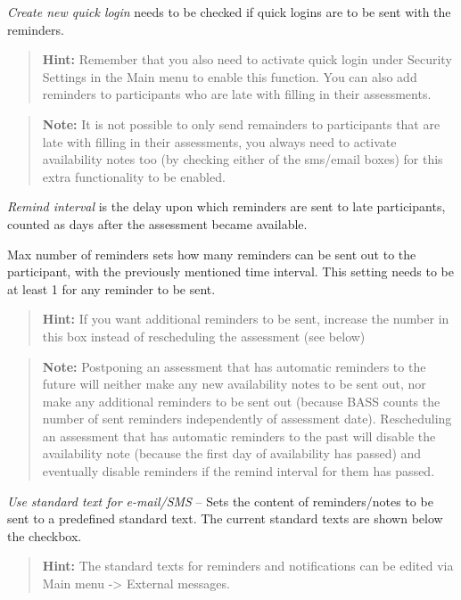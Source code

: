 \documentclass[]{book}
\begin{document}
\emph{Create new quick login} needs to be checked if quick logins are to be sent with the reminders.

\begin{quote}
\textbf{Hint:} Remember that you also need to activate quick login under Security Settings in the Main menu to enable this function.
You can also add reminders to participants who are late with filling in their assessments.
\end{quote}

\begin{quote}
\textbf{Note:} It is not possible to only send remainders to participants that are late with filling in their assessments, you always need to activate availability notes too (by checking either of the sms/email boxes) for this extra functionality to be enabled.
\end{quote}

\emph{Remind interval} is the delay upon which reminders are sent to late participants, counted as days after the assessment became available.

Max number of reminders sets how many reminders can be sent out to the participant, with the previously mentioned time interval. This setting needs to be at least 1 for any reminder to be sent.

\begin{quote}
\textbf{Hint:} If you want additional reminders to be sent, increase the number in this box instead of rescheduling the assessment (see below)
\end{quote}

\begin{quote}
\textbf{Note:} Postponing an assessment that has automatic reminders to the future will neither make any new availability notes to be sent out, nor make any additional reminders to be sent out (because BASS counts the number of sent reminders independently of assessment date). Rescheduling an assessment that has automatic reminders to the past will disable the availability note (because the first day of availability has passed) and eventually disable reminders if the remind interval for them has passed.
\end{quote}

\emph{Use standard text for e-mail/SMS} -- Sets the content of reminders/notes to be sent to a predefined standard text. The current standard texts are shown below the checkbox.

\begin{quote}
\textbf{Hint:} The standard texts for reminders and notifications can be edited via Main menu -\textgreater{} External messages.
\end{quote}
\end{document}
